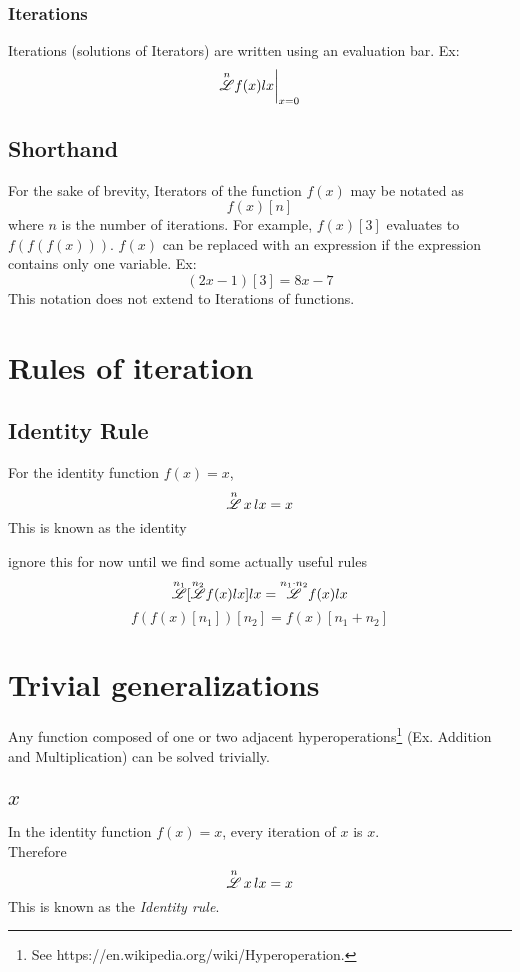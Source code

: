 \documentclass[12pt, letterpaper]{article}
\begin{document}
\subsubsection{Iterations}
Iterations (solutions of Iterators) are written using an evaluation bar. Ex:
$$\overset{n}{\mathscr{L}}f(x)lx\bigg|_{x=0}$$

\subsection{Shorthand}
For the sake of brevity, Iterators of the function $f(x)$ may be notated as
$$f(x)[n]$$ 
where $n$ is the number of iterations. For example, $f(x)[3]$ evaluates to $f(f(f(x)))$. $f(x)$ can be replaced with an expression if the expression contains only one variable. Ex:
$$(2x-1)[3] = 8x-7$$
This notation does not extend to Iterations of functions.

\section{Rules of iteration}

\subsection{Identity Rule}
For the identity function $f(x) = x$, 
\[
\overset{n}{\mathscr{L}} \, x \, lx = x
\]
This is known as the identity 

ignore this for now until we find some actually useful rules
$$\overset{n_1}{\mathscr{L}}[\overset{n_2}{\mathscr{L}} f(x) lx] lx = \overset{n_1\cdot n_2}{\mathscr{L}} f(x) lx$$
$$f(f(x)[n_1])[n_2] = f(x)[n_1+n_2]$$

\section{Trivial generalizations}
Any function composed of one or two adjacent hyperoperations\footnote{See https://en.wikipedia.org/wiki/Hyperoperation.} (Ex. Addition and Multiplication) can be solved trivially.

\subsection{$x$}
In the identity function \(f(x) = x\), every iteration of \(x\) is \(x\). 
\\
Therefore
$$\overset{n}{\mathscr{L}} \, x \, lx = x$$
This is known as the \textit{Identity rule}.
\end{document}
